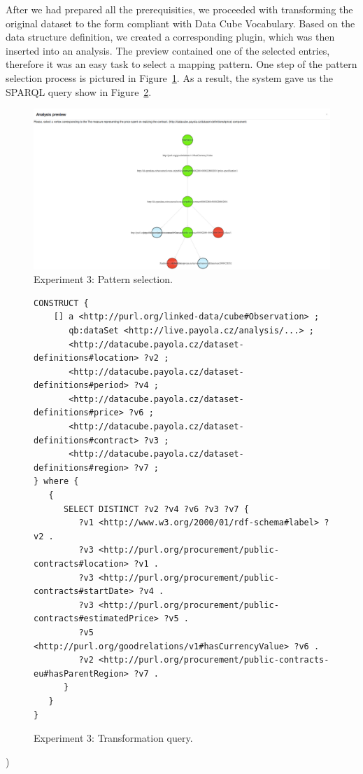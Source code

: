 After we had prepared all the prerequisities, we proceeded with transforming the 
original dataset to the form compliant with Data Cube Vocabulary. Based on the 
data structure definition, we created a corresponding plugin, which was then 
inserted into an analysis. The preview contained one of the selected entries, 
therefore it was an easy task to select a mapping pattern. One step of the 
pattern selection process is pictured in Figure~\ref{fig:contracts-pattern}.
As a result, the system gave us the SPARQL query show in 
Figure~\ref{fig:contracts-query-pattern}.

\begin{figure}
  \centering
  \includegraphics[width=140mm]{img/contracts-pattern.png}
  \caption{Experiment 3: Pattern selection.}
  \label{fig:contracts-pattern}
\end{figure}

\begin{figure}
  \scriptsize
  \begin{verbatim}
CONSTRUCT {
    [] a <http://purl.org/linked-data/cube#Observation> ;
       qb:dataSet <http://live.payola.cz/analysis/...> ;
       <http://datacube.payola.cz/dataset-definitions#location> ?v2 ;
       <http://datacube.payola.cz/dataset-definitions#period> ?v4 ;
       <http://datacube.payola.cz/dataset-definitions#price> ?v6 ;
       <http://datacube.payola.cz/dataset-definitions#contract> ?v3 ;
       <http://datacube.payola.cz/dataset-definitions#region> ?v7 ;
} where {
   {
      SELECT DISTINCT ?v2 ?v4 ?v6 ?v3 ?v7 {
         ?v1 <http://www.w3.org/2000/01/rdf-schema#label> ?v2 .
         ?v3 <http://purl.org/procurement/public-contracts#location> ?v1 .
         ?v3 <http://purl.org/procurement/public-contracts#startDate> ?v4 .
         ?v3 <http://purl.org/procurement/public-contracts#estimatedPrice> ?v5 .
         ?v5 <http://purl.org/goodrelations/v1#hasCurrencyValue> ?v6 .
         ?v2 <http://purl.org/procurement/public-contracts-eu#hasParentRegion> ?v7 .
      }
   }
} 
  \end{verbatim}
  \label{fig:contracts-query-pattern}
  \caption{Experiment 3: Transformation query.}
\end{figure}
)

